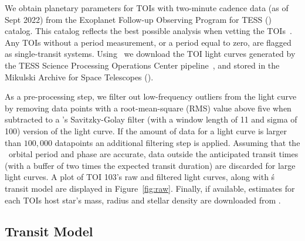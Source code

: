 \documentclass[floatfix,ApJL,twocolumn]{aastex631}
\begin{document}
We obtain planetary parameters for \numTessCandidates TOIs with two-minute cadence data (as of Sept 2022) from the Exoplanet Follow-up Observing Program for TESS (\exofop) catalog.
This catalog reflects the best possible analysis when vetting the TOIs~\citep{Guerrero:2021:ApJS,}.
Any TOIs without a period measurement, or a period equal to zero, are flagged as single-transit systems. 
Using \lightkurve\ we download the TOI light curves generated by the TESS Science Processing Operations Center pipeline~\citep{Jenkins:2016:SPIE, Jenkins:2021:tsc2}, and stored in the Mikulski Archive for Space Telescopes (\mast).

As a pre-processing step, we filter out low-frequency outliers from the light curve by removing data points with a root-mean-square (RMS) value above five when subtracted to a \scipy’s Savitzky-Golay filter (with a window length of 11 and sigma of 100) version of the light curve. 
If the amount of data for a light curve is larger than $100,000$ datapoints an additional filtering step is applied. 
Assuming that the \exofop\ orbital period and phase are accurate, data outside the anticipated transit times (with a buffer of two times the expected transit duration) are discarded for large light curves.
A plot of {TOI 103}'s raw and filtered light curves, along with \exofop\'s transit model are displayed in Figure~\ref{fig:raw}.
Finally, if available, estimates for each TOIs host star's mass, radius and stellar density are downloaded from \mast. 



\subsection{Transit Model}
\end{document}
